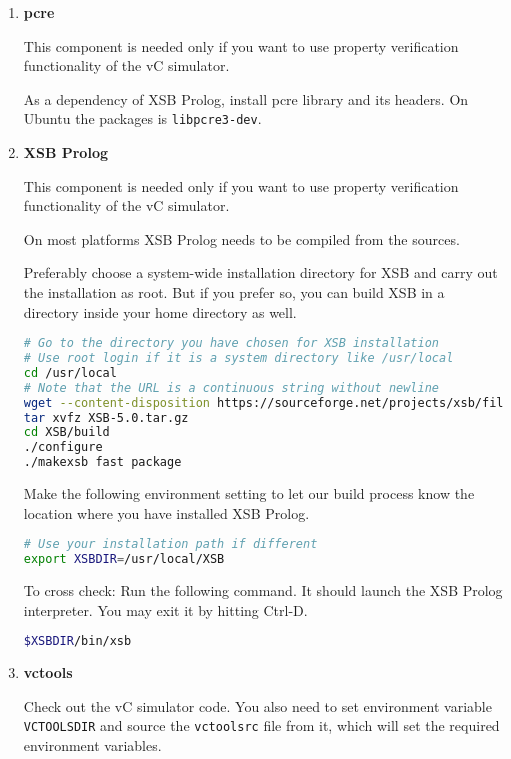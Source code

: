 \documentclass[12pt,a4paper]{article}
\begin{document}
\begin{enumerate}
\newcommand{\verifonly}{This component is needed only if you want to use property verification functionality of the vC simulator.}

\item \textbf{pcre}

\verifonly

As a dependency of XSB Prolog, install pcre library and its headers. On Ubuntu the packages is \texttt{libpcre3-dev}.

\item \textbf{XSB Prolog}

\verifonly

On most platforms XSB Prolog needs to be compiled from the sources.

Preferably choose a system-wide installation directory for XSB and carry out the installation as root. But if you prefer so, you can build XSB in a directory inside your home directory as well.

\begin{lstlisting}[language=bash,style=snippet]
# Go to the directory you have chosen for XSB installation
# Use root login if it is a system directory like /usr/local
cd /usr/local
# Note that the URL is a continuous string without newline
wget --content-disposition https://sourceforge.net/projects/xsb/files/xsb/5.0%20%28Green%20Tea%29/XSB-5.0.tar.gz/download
tar xvfz XSB-5.0.tar.gz
cd XSB/build
./configure
./makexsb fast package
\end{lstlisting}

Make the following environment setting to let our build process know the location where you have installed XSB Prolog.

\begin{lstlisting}[language=bash,style=snippet]
# Use your installation path if different
export XSBDIR=/usr/local/XSB
\end{lstlisting}

To cross check: Run the following command. It should launch the XSB Prolog interpreter. You may exit it by hitting Ctrl-D.

\begin{lstlisting}[language=bash,style=snippet]
$XSBDIR/bin/xsb
\end{lstlisting}

\item \textbf{vctools}

Check out the vC simulator code. You also need to set environment variable \texttt{VCTOOLSDIR} and source the \texttt{vctoolsrc} file from it, which will set the required environment variables.


\end{enumerate}
\end{document}
